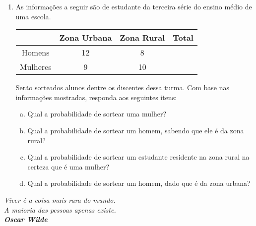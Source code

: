 \documentclass[twocolumn,oneside,a4paper,12pt]{article}
\begin{document}
\begin{enumerate}

\item As informações a seguir são de estudante da terceira série do ensino médio de uma escola.

\begin{tabular}{cccc}
\hline 
 & Zona Urbana & Zona Rural & Total \\ 
\hline 
Homens & 12 & 8 &  \\ 
Mulheres & 9 & 10 &  \\ 
\hline
\end{tabular} 

Serão sorteados alunos dentre os discentes dessa turma. Com base nas informações mostradas, responda aos seguintes itens:
\begin{enumerate}[(a)]
\item Qual a probabilidade de sortear uma mulher?
\item Qual a probabilidade de sortear um homem, sabendo que ele é da zona rural?
\item Qual a probabilidade de sortear um estudante residente na zona rural na certeza que é uma mulher?
\item Qual a probabilidade de sortear um homem, dado que é da zona urbana?
\end{enumerate}

\end{enumerate}

\begin{flushright}
\textit{Viver é a coisa mais rara do mundo.\\A maioria das pessoas apenas existe.\\\textbf{Oscar Wilde}}
\end{flushright}
\end{document}
